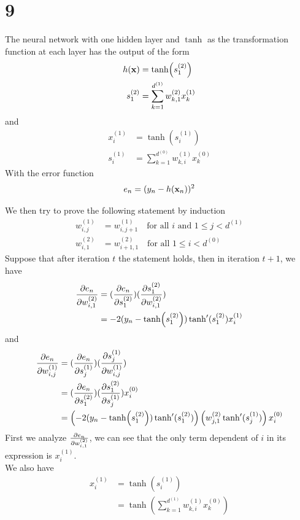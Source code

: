 \documentclass[11pt]{article}
\theoremstyle{definition}
\begin{document}
\section*{9}
The neural network with one hidden layer and $\tanh$ as the transformation function at each layer has the output of the form
\begin{align*}
  h(\vb{x}) &= \tanh(s_1^{(2)}) \\
  s_1^{(2)} &= \sum_{k = 1}^{d^{(1)}}w_{k, 1}^{(2)}x_k^{(1)}
\end{align*}
and 
\begin{align*}
  x_i^{(1)} &= \tanh(s_i^{(1)}) \\ 
  s_i^{(1)} &= \sum_{k = 1}^{d^{(0)}}w_{k, i}^{(1)}x_k^{(0)}
\end{align*}
With the error function
\[
  e_n = (y_n - h(\vb{x}_n))^2
\]
\par 
We then try to prove the following statement by induction
\begin{align}
  w_{i, j}^{(1)} &= w_{i, j + 1}^{(1)}\quad\text{for all $i$ and $1\leq j < d^{(1)}$} \\ 
  w_{i, 1}^{(2)} &= w_{i + 1, 1}^{(2)}\quad\text{for all $1\leq i < d^{(0)}$}
\end{align}
Suppose that after iteration $t$ the statement holds, then in iteration $t + 1$, we have
\begin{align*}
  \pdv{e_n}{w_{i, 1}^{(2)}} &= (\pdv{e_n}{s_1^{(2)}})(\pdv{s_1^{(2)}}{w_{i, 1}^{(2)}}) \\ 
  &= -2(y_n - \tanh(s_1^{(2)}))\tanh^\prime(s_1^{(2)})x_i^{(1)}
\end{align*}
and
\begin{align*}
  \pdv{e_n}{w_{i, j}^{(1)}} &= (\pdv{e_n}{s_j^{(1)}})(\pdv{s_j^{(1)}}{w_{i, j}^{(1)}}) \\ 
  &= (\pdv{e_n}{s_1^{(2)}})(\pdv{s_1^{(2)}}{s_j^{(1)}})x_i^{(0)} \\
  &= \left(-2(y_n - \tanh(s_1^{(2)}))\tanh^\prime(s_1^{(2)})\right)\left(w_{j, 1}^{(2)}\tanh^\prime(s_j^{(1)})\right)x_i^{(0)}
\end{align*}
\newpage
First we analyze $\pdv{e_n}{w_{i, 1}^{(2)}}$, we can see that the only term dependent of $i$ in its expression is $x_i^{(1)}$. \\ 
We also have
\begin{align*}
  x_i^{(1)} &= \tanh(s_i^{(1)}) \\ 
  &= \tanh(\sum_{k = 1}^{d^{(1)}}w_{k, i}^{(1)}x_k^{(0)}) \\
\end{align*}
\end{document}
